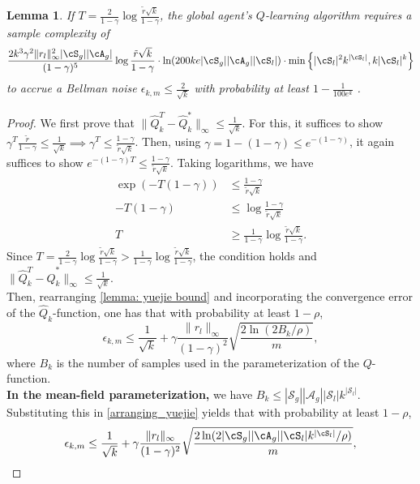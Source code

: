 \documentclass{article}
\theoremstyle{plain}
\newtheorem{lemma}[theorem]{Lemma}
\theoremstyle{definition}
\begin{document}
\begin{lemma}\label{lemma: epsilon_km_is_k} If $T= \frac{2}{1-\gamma}\log \frac{\tilde{r}\sqrt{k}}{1-\gamma}$, the global agent's $Q$-learning algorithm requires a sample complexity of \[\frac{2k^3\gamma^2\|r_l\|^2_\infty |\cS_g| |\cA_g|}{(1-\gamma)^5}\log \frac{\tilde{r}\sqrt{k}}{1-\gamma} \cdot \ln(200ke |\cS_g||\cA_g| |\cS_l|)\cdot \min\left\{|\cS_l|^2  k^{|\cS_l|} ,  k |\cS_l|^k \right\}\] to accrue a Bellman noise $\epsilon_{k,m}\leq \frac{2}{\sqrt{k}}$ with probability at least $1 - \frac{1}{100e^k}$ .\end{lemma}
\begin{proof}
We first prove that $\|\hat{Q}_k^T - \hat{Q}_k^*\|_\infty \leq \frac{1}{\sqrt{k}}$.  For this, it suffices to show $\gamma^T \frac{\tilde{r}}{1-\gamma} \leq \frac{1}{\sqrt{k}} \implies \gamma^T \leq \frac{1-\gamma}{\tilde{r}\sqrt{k}}$. Then, using $\gamma = 1 - (1 - \gamma) \leq e^{-(1-\gamma)}$, it again suffices to show $e^{-(1-\gamma)T}\leq \frac{1-\gamma}{\tilde{r}\sqrt{k}}$. Taking logarithms, we have
\begin{align*}
    \exp(-T(1-\gamma)) &\leq \frac{1-\gamma}{\tilde{r}\sqrt{k}} \\
    -T(1-\gamma) &\leq \log\frac{1-\gamma}{\tilde{r}\sqrt{k}} \\
    T&\geq \frac{1}{1-\gamma}\log\frac{\tilde{r}\sqrt{k}}{1-\gamma}.
\end{align*}
Since $T = \frac{2}{1-\gamma}\log\frac{\tilde{r}\sqrt{k}}{1-\gamma} > \frac{1}{1-\gamma}\log\frac{\tilde{r}\sqrt{k}}{1-\gamma}$, the condition holds and $\|\hat{Q}_k^T - \hat{Q}_k^*\|_\infty \leq \frac{1}{\sqrt{k}}$. \\

Then, rearranging \cref{lemma: yuejie bound} and incorporating the convergence error of the $\hat{Q}_k$-function, one has that with probability at least $1-\rho$, 
\begin{equation}\label{arranging_yuejie}
        \epsilon_{k,m} \leq \frac{1}{\sqrt{k}} + \gamma \frac{\|r_l\|_\infty}{(1-\gamma)^2}\sqrt{\frac{2\ln(2B_k/\rho)}{m}},
    \end{equation}
    where $B_k$ is the number of samples used in the parameterization of the $Q$-function. \\
    
    \textbf{In the mean-field parameterization,} we have $B_k \leq |\mathcal{S}_g||\mathcal{A}_g||\mathcal{S}_l| k^{|\mathcal{S}_l|}$. Substituting this in \cref{arranging_yuejie} yields that  with probability at least $1-\rho$,
    \begin{equation}
        \epsilon_{k,m} \leq \frac{1}{\sqrt{k}}+ \gamma \frac{\|r_l\|_\infty}{(1-\gamma)^2}\sqrt{\frac{2\ln(2|\cS_g||\cA_g||\cS_l| k^{|\cS_l|} /\rho)}{m}},
    \end{equation}
    

\end{proof}
\end{document}
